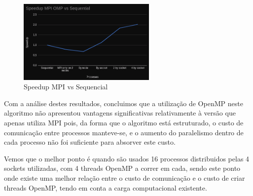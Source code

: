 \documentclass[a4paper]{report}
\begin{document}
\begin{figure}[h]
    \centering
    \includegraphics[width=0.6\textwidth]{images/speedupsompi.png}
    \caption{Speedup MPI vs Sequencial}
    \label{img:smpi}
\end{figure}

Com a análise destes resultados, concluimos que a utilização de OpenMP neste
algoritmo não apresentou vantagens significativas relativamente à versão que
apenas utiliza MPI pois, da forma que o algoritmo está estruturado, o custo de
comunicação entre processos manteve-se, e o aumento do paralelismo dentro de
cada processo não foi suficiente para absorver este custo.

Vemos que o melhor ponto é quando são usados 16 processos distribuidos pelas 4
sockets utilizadas, com 4 threads OpenMP a correr em cada, sendo este ponto onde
existe uma melhor relação entre o custo de comunicação e o custo de criar
threads OpenMP, tendo em conta a carga computacional existente.
\end{document}
